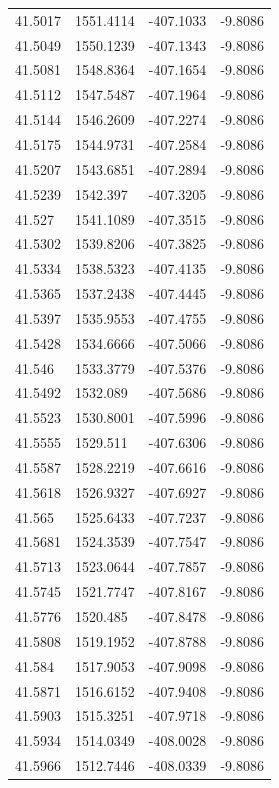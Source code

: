 \begin{table}[H]
\begin{tabular}{llll}
41.5017 & 1551.4114 & -407.1033 & -9.8086 \\
41.5049 & 1550.1239 & -407.1343 & -9.8086 \\
41.5081 & 1548.8364 & -407.1654 & -9.8086 \\
41.5112 & 1547.5487 & -407.1964 & -9.8086 \\
41.5144 & 1546.2609 & -407.2274 & -9.8086 \\
41.5175 & 1544.9731 & -407.2584 & -9.8086 \\
41.5207 & 1543.6851 & -407.2894 & -9.8086 \\
41.5239 & 1542.397 & -407.3205 & -9.8086 \\
41.527 & 1541.1089 & -407.3515 & -9.8086 \\
41.5302 & 1539.8206 & -407.3825 & -9.8086 \\
41.5334 & 1538.5323 & -407.4135 & -9.8086 \\
41.5365 & 1537.2438 & -407.4445 & -9.8086 \\
41.5397 & 1535.9553 & -407.4755 & -9.8086 \\
41.5428 & 1534.6666 & -407.5066 & -9.8086 \\
41.546 & 1533.3779 & -407.5376 & -9.8086 \\
41.5492 & 1532.089 & -407.5686 & -9.8086 \\
41.5523 & 1530.8001 & -407.5996 & -9.8086 \\
41.5555 & 1529.511 & -407.6306 & -9.8086 \\
41.5587 & 1528.2219 & -407.6616 & -9.8086 \\
41.5618 & 1526.9327 & -407.6927 & -9.8086 \\
41.565 & 1525.6433 & -407.7237 & -9.8086 \\
41.5681 & 1524.3539 & -407.7547 & -9.8086 \\
41.5713 & 1523.0644 & -407.7857 & -9.8086 \\
41.5745 & 1521.7747 & -407.8167 & -9.8086 \\
41.5776 & 1520.485 & -407.8478 & -9.8086 \\
41.5808 & 1519.1952 & -407.8788 & -9.8086 \\
41.584 & 1517.9053 & -407.9098 & -9.8086 \\
41.5871 & 1516.6152 & -407.9408 & -9.8086 \\
41.5903 & 1515.3251 & -407.9718 & -9.8086 \\
41.5934 & 1514.0349 & -408.0028 & -9.8086 \\
41.5966 & 1512.7446 & -408.0339 & -9.8086 \\

\end{tabular}
\end{table}
